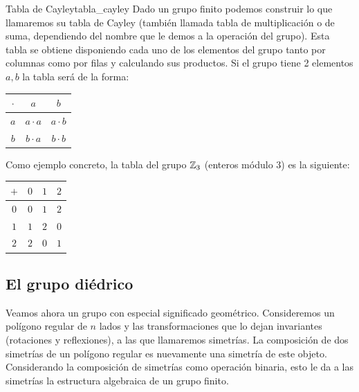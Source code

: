 \begin{example}{Tabla de Cayley}{tabla_cayley}
    Dado un grupo finito podemos construir lo que llamaremos su tabla de Cayley (también llamada tabla de multiplicación o de suma, dependiendo del nombre que le demos a la operación del grupo). Esta tabla se obtiene disponiendo cada uno de los elementos del grupo tanto por columnas como por filas y calculando sus productos. Si el grupo tiene 2 elementos $a,b$ la tabla será de la forma:
    \begin{center}
        \begin{tabular}{c | c | c}
            $\cdot$ & $a$ & $b$ \\
            \hline
            $a$ & $a \cdot a$ & $a \cdot b$  \\ 
            \hline
            $b$ & $b \cdot a$ & $b \cdot b$ \\
            \hline
        \end{tabular}
    \end{center}

    Como ejemplo concreto, la tabla del grupo $\mathbb{Z}_3$ (enteros módulo 3) es la siguiente:
    \vspace{10pt}
    \begin{center}
        \begin{tabular}{c | c | c | c}
            $+$ & $0$ & $1$ & $2$ \\
            \hline
            $0$ & $0$ & $1$ & $2$ \\ 
            \hline
            $1$ & $1$ & $2$ & $0$ \\ 
            \hline
            $2$ & $2$ & $0$ & $1$ \\ 
            \hline
        \end{tabular}
    \end{center}
\end{example}

\subsection{El grupo diédrico}

Veamos ahora un grupo con especial significado geométrico. Consideremos un polígono regular de \(n\) lados y las transformaciones que lo dejan invariantes (rotaciones y reflexiones), a las que llamaremos simetrías. La composición de dos simetrías de un polígono regular es nuevamente una simetría de este objeto. Considerando la composición de simetrías como operación binaria, esto le da a las simetrías la estructura algebraica de un grupo finito.

